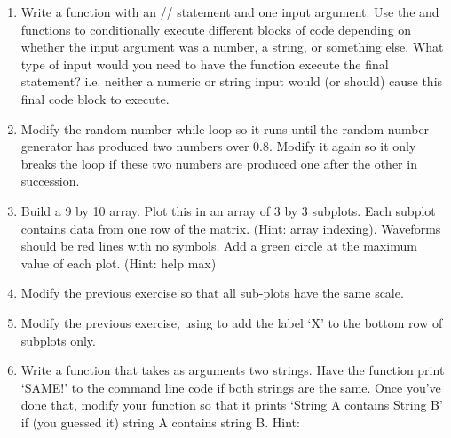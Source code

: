 \documentclass{article}
\begin{document}
\begin{enumerate}
\item Write a function with an // statement and one input argument. Use the  and  functions to conditionally execute different blocks of code depending on whether the input argument was a number, a string, or something else. What type of input would you need to have the function execute the final  statement? i.e. neither a numeric or string input would (or should) cause this final code block to execute.

\item Modify the random number while loop so it runs until the random number generator has produced two numbers over 0.8. Modify it again so it only breaks the loop if these two numbers are produced one after the other in succession.

\item Build a 9 by 10 array. Plot this in an array of 3 by 3 subplots. Each subplot contains data from one row of the matrix. (Hint: array indexing). Waveforms should be red lines with no symbols. Add a green circle at the maximum value of each plot. (Hint: help max)

\item Modify the previous exercise so that all sub-plots have the same scale.

\item Modify the previous exercise, using  to add the label `X' to the bottom row of subplots only.

\item Write a function that takes as arguments two strings. Have the function print `SAME!' to the command line code if both strings are the same. Once you've done that,  modify your function so that it prints `String A contains String B' if (you guessed it) string A contains string B. Hint: 

\end{enumerate}
\end{document}
